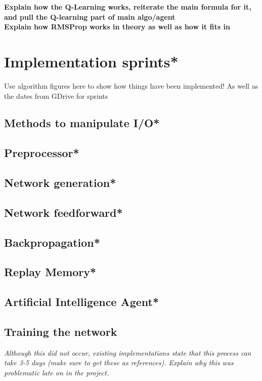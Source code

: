 \documentclass[10pt]{article}
\begin{document}
		\textbf{Explain how the Q-Learning works, reiterate the main formula for it, and pull the Q-learning part of main algo/agent}\\
		
		\textbf{Explain how RMSProp works in theory as well as how it fits in}
	
	\bigskip

\section{Implementation sprints*}
	Use algorithm figures here to show how things have been implemented! As well as the dates from GDrive for sprints
	\subsection{Methods to manipulate I/O*}
	
	\subsection{Preprocessor*}
	
	\subsection{Network generation*}
	
	\subsection{Network feedforward*}
	
	\subsection{Backpropagation*}
	
	\subsection{Replay Memory*}
	
	\subsection{Artificial Intelligence Agent*}
	
	\subsection{Training the network}
		\textit{Although this did not occur, existing implementations state that this process can take 3-5 days (make sure to get these as references). Explain why this was problematic late on in the project.}
\end{document}
